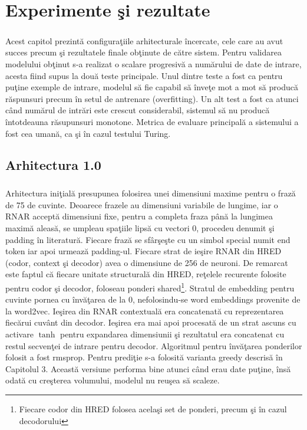 \chapter{Experimente \c si rezultate}

\paragraph{}
Acest capitol prezint\u a configura\c tiile arhitecturale \^ incercate, cele care au avut succes precum \c si rezultatele finale ob\c tinute de c\u atre sistem. Pentru validarea modelului ob\c tinut s-a realizat o scalare progresiv\u a a num\u arului de date de intrare, acesta fiind supus la dou\u a teste principale. Unul dintre teste a fost ca pentru pu\c tine exemple de intrare, modelul s\u a fie capabil s\u a \^ inve\c te mot a mot s\u a produc\u a r\u aspunsuri precum \^ in setul de antrenare (overfitting). Un alt test a fost ca atunci c\^ and num\u arul de intr\u ari este crescut considerabil, sistemul s\u a nu produc\u a \^ intotdeauna r\u asupunsuri monotone. Metrica de evaluare principal\u a a sistemului a fost cea uman\u a, ca \c si \^ in cazul testului Turing.

\section{Arhitectura 1.0}

\paragraph{}
Arhitectura ini\c tial\u a presupunea folosirea unei dimensiuni maxime pentru o fraz\u a de 75 de cuvinte. Deoarece frazele au dimensiuni variabile de lungime, iar o RNAR accept\u a dimensiuni fixe, pentru a completa fraza p\^ an\u a la lungimea maxim\u a aleas\u a, se umpleau spa\c tiile lips\u a cu vectori \(0\), procedeu denumit \c si padding \^ in literatur\u a. Fiecare fraz\u a se sf\^ ar\c se\c ste cu un simbol special numit end token iar apoi urmeaz\u a padding-ul.  Fiecare strat de ie\c sire RNAR din HRED (codor, context \c si decodor) avea o dimensiune de 256 de neuroni. De remarcat este faptul c\u a fiecare unitate structural\u a din HRED, re\c telele recurente folosite pentru codor \c si decodor, foloseau ponderi shared\footnote{Fiecare codor din HRED folosea acela\c si set de ponderi, precum \c si \^ in cazul decodorului}. Stratul de embedding pentru cuvinte pornea cu \^ inv\u a\c tarea de la 0, nefolosindu-se word embeddings provenite de la word2vec. Ie\c sirea din RNAR contextual\u a era concatenat\u a cu reprezentarea fiec\u arui cuv\^ ant din decodor. Ie\c sirea era mai apoi procesat\u a de un strat ascuns cu activare \(\tanh\) pentru expandarea dimensiunii \c si rezultatul era concatenat cu restul secven\c tei de intrare pentru decodor. Algoritmul pentru \^ inv\u a\c tarea ponderilor folosit a fost rmsprop. Pentru predi\c tie s-a folosit\u a varianta greedy descris\u a \^ in Capitolul 3. Aceast\u a versiune performa bine atunci c\^ and erau date pu\c tine, \^ ins\u a odat\u a cu cre\c sterea volumului, modelul nu reu\c sea s\u a scaleze.

